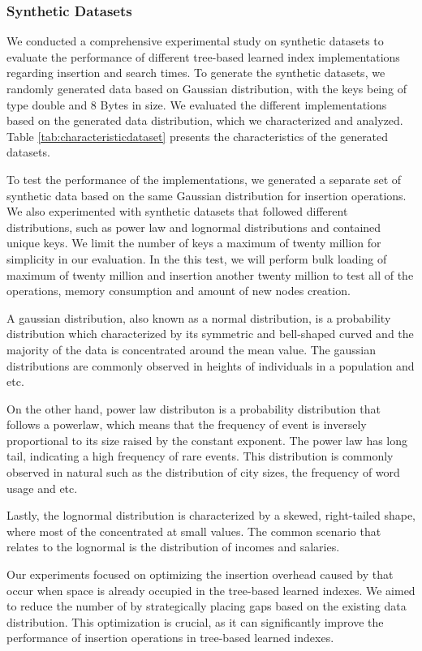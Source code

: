 \subsubsection{Synthetic Datasets}
We conducted a comprehensive experimental study on synthetic datasets to evaluate the performance of different tree-based learned index implementations regarding insertion and search times. To generate the synthetic datasets, we randomly generated data based on Gaussian distribution, with the keys being of type double and 8 Bytes in size. We evaluated the different implementations based on the generated data distribution, which we characterized and analyzed. Table \ref{tab:characteristicdataset} presents the characteristics of the generated datasets.

To test the performance of the implementations, we generated a separate set of synthetic data based on the same Gaussian distribution for insertion operations. We also experimented with synthetic datasets that followed different distributions, such as power law and lognormal distributions and contained unique keys. We limit the number of keys a maximum of twenty million for simplicity in our evaluation. In the this test, we will perform bulk loading of maximum of twenty million and insertion another twenty million to test all of the operations, memory consumption and amount of new nodes creation.

A gaussian distribution, also known as a normal distribution, is a probability distribution which characterized by its symmetric and bell-shaped curved and the majority of the data is concentrated around the mean value. The gaussian distributions are commonly observed in heights of individuals in a population and etc. 

On the other hand, power law distributon is a probability distribution that follows a powerlaw, which means that the frequency of event is inversely proportional to its size raised by the constant exponent. The power law has long tail, indicating a high frequency of rare events. This distribution is commonly observed in natural such as the distribution of city sizes, the frequency of word usage and etc. 

Lastly, the lognormal distribution is characterized by a skewed, right-tailed shape, where most of the concentrated at small values. The common scenario that relates to the lognormal is the distribution of incomes and salaries.

Our experiments focused on optimizing the insertion overhead caused by \conflict that occur when space is already occupied in the tree-based learned indexes. We aimed to reduce the number of \conflict by strategically placing gaps based on the existing data distribution. This optimization is crucial, as it can significantly improve the performance of insertion operations in tree-based learned indexes.

